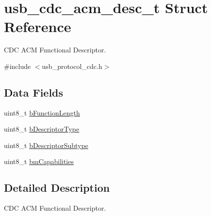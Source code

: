 \hypertarget{structusb__cdc__acm__desc__t}{
\section{usb\-\_\-cdc\-\_\-acm\-\_\-desc\-\_\-t \-Struct \-Reference}
\label{structusb__cdc__acm__desc__t}
}


\-C\-D\-C \-A\-C\-M \-Functional \-Descriptor.  




{\ttfamily \#include $<$usb\-\_\-protocol\-\_\-cdc.\-h$>$}

\subsection*{\-Data \-Fields}
\begin{DoxyCompactItemize}
\item 
uint8\-\_\-t \hyperlink{structusb__cdc__acm__desc__t_ae803c98292de979d7c7345fa92b80ad0}{b\-Function\-Length}
\item 
uint8\-\_\-t \hyperlink{structusb__cdc__acm__desc__t_ac3fc0045813e83d431d42ed0c6d8b374}{b\-Descriptor\-Type}
\item 
uint8\-\_\-t \hyperlink{structusb__cdc__acm__desc__t_a3c39791b6ae51bfa6730a6fc7094c04b}{b\-Descriptor\-Subtype}
\item 
uint8\-\_\-t \hyperlink{structusb__cdc__acm__desc__t_af37f070f757a7ea8f48c879c1865f54f}{bm\-Capabilities}
\end{DoxyCompactItemize}


\subsection{\-Detailed \-Description}
\-C\-D\-C \-A\-C\-M \-Functional \-Descriptor. 

